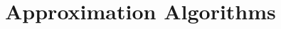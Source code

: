 \documentclass[letter]{book}
\theoremstyle{definition}
\theoremstyle{definition}
\theoremstyle{remark}
\begin{document}
\setcounter{chapter}{34}

\chapter{Approximation Algorithms}
\end{document}
